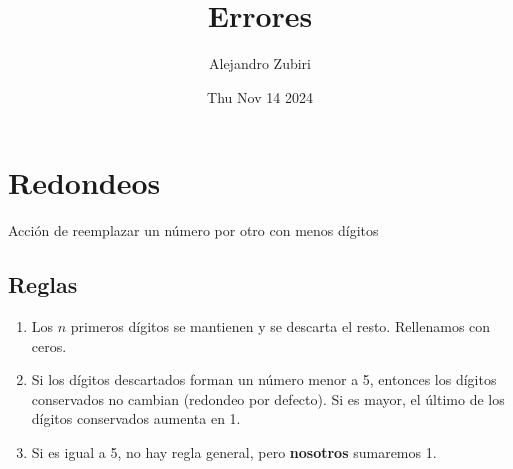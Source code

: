 \documentclass{article}
\author{Alejandro Zubiri}
\date{Thu Nov 14 2024}
\title{Errores}
\begin{document}
\maketitle
\tableofcontents
\pagebreak

\section{Redondeos}
Acción de reemplazar un número por otro con menos dígitos
\subsection{Reglas}
\begin{enumerate}
    \item Los $n$ primeros dígitos se mantienen y se descarta el resto. Rellenamos con ceros.
    \item Si los dígitos descartados forman un número menor a 5, entonces los dígitos
    conservados no cambian (redondeo por defecto). Si es mayor, el último de los dígitos
    conservados aumenta en 1.
    \item Si es igual a 5, no hay regla general, pero \textbf{nosotros} sumaremos 1.
\end{enumerate}
\end{document}
